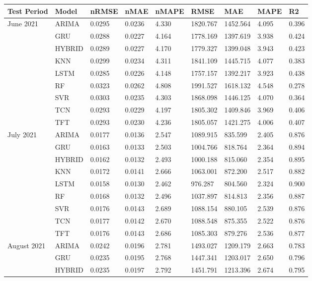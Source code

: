 \begin{tabular}{lllllllll}
\toprule
Test Period & Model & nRMSE & nMAE & nMAPE & RMSE & MAE & MAPE & R2 \\
\midrule
June 2021 & ARIMA & 0.0295 & 0.0236 & 4.330 & 1820.767 & 1452.564 & 4.095 & 0.396 \\
 & GRU & 0.0288 & 0.0227 & 4.164 & 1778.169 & 1397.619 & 3.938 & 0.424 \\
 & HYBRID & 0.0289 & 0.0227 & 4.170 & 1779.327 & 1399.048 & 3.943 & 0.423 \\
 & KNN & 0.0299 & 0.0234 & 4.311 & 1841.109 & 1445.715 & 4.077 & 0.383 \\
 & LSTM & 0.0285 & 0.0226 & 4.148 & 1757.157 & 1392.217 & 3.923 & 0.438 \\
 & RF & 0.0323 & 0.0262 & 4.808 & 1991.527 & 1618.132 & 4.548 & 0.278 \\
 & SVR & 0.0303 & 0.0235 & 4.303 & 1868.098 & 1446.125 & 4.070 & 0.364 \\
 & TCN & 0.0293 & 0.0229 & 4.197 & 1805.302 & 1409.846 & 3.969 & 0.406 \\
 & TFT & 0.0293 & 0.0230 & 4.236 & 1805.057 & 1421.275 & 4.006 & 0.407 \\
July 2021 & ARIMA & 0.0177 & 0.0136 & 2.547 & 1089.915 & 835.599 & 2.405 & 0.876 \\
 & GRU & 0.0163 & 0.0133 & 2.503 & 1004.766 & 818.764 & 2.364 & 0.894 \\
 & HYBRID & 0.0162 & 0.0132 & 2.493 & 1000.188 & 815.060 & 2.354 & 0.895 \\
 & KNN & 0.0172 & 0.0141 & 2.666 & 1063.001 & 872.200 & 2.517 & 0.882 \\
 & LSTM & 0.0158 & 0.0130 & 2.462 & 976.287 & 804.560 & 2.324 & 0.900 \\
 & RF & 0.0168 & 0.0132 & 2.496 & 1037.897 & 814.813 & 2.356 & 0.887 \\
 & SVR & 0.0176 & 0.0143 & 2.689 & 1088.154 & 880.105 & 2.539 & 0.876 \\
 & TCN & 0.0177 & 0.0142 & 2.670 & 1088.548 & 875.355 & 2.522 & 0.876 \\
 & TFT & 0.0176 & 0.0143 & 2.686 & 1085.303 & 879.276 & 2.536 & 0.877 \\
August 2021 & ARIMA & 0.0242 & 0.0196 & 2.781 & 1493.027 & 1209.179 & 2.663 & 0.783 \\
 & GRU & 0.0235 & 0.0195 & 2.768 & 1447.341 & 1203.017 & 2.650 & 0.796 \\
 & HYBRID & 0.0235 & 0.0197 & 2.792 & 1451.791 & 1213.396 & 2.674 & 0.795 \\

\end{tabular}

